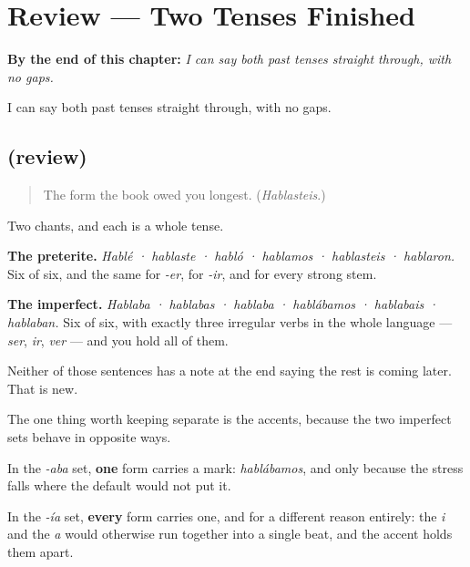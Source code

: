 
\chapter{Review --- Two Tenses Finished}
\label{ch:repaso-paradigmas}

\begin{chapteropening}
\textbf{By the end of this chapter:} \emph{I can say both past tenses straight through, with no gaps.}

I can say both past tenses straight through, with no gaps.
\end{chapteropening}

\section[(review)]{(review)}

\label{lesson:ES-C63-repaso-paradigmas}



\begin{quote}
The form the book owed you longest. (\emph{Hablasteis}.)
\end{quote}

\begin{grammarlens}[title={What you've built}]
Two chants, and each is a whole tense.

\textbf{The preterite.} \emph{Hablé · hablaste · habló · hablamos · hablasteis · hablaron.} Six of six, and the same for \emph{-er}, for \emph{-ir}, and for every strong stem.

\textbf{The imperfect.} \emph{Hablaba · hablabas · hablaba · hablábamos · hablabais · hablaban.} Six of six, with exactly three irregular verbs in the whole language — \emph{ser}, \emph{ir}, \emph{ver} — and you hold all of them.

Neither of those sentences has a note at the end saying the rest is coming later. That is new.
\end{grammarlens}

\begin{grammarlens}[title={Grammar Lens: where the accents fall}]
The one thing worth keeping separate is the accents, because the two imperfect sets behave in opposite ways.

In the \emph{-aba} set, \textbf{one} form carries a mark: \emph{hablábamos}, and only because the stress falls where the default would not put it.

In the \emph{-ía} set, \textbf{every} form carries one, and for a different reason entirely: the \emph{i} and the \emph{a} would otherwise run together into a single beat, and the accent holds them apart.
\end{grammarlens}

